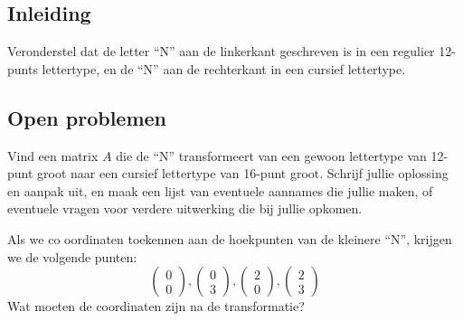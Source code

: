\documentclass{ximera}
\begin{document}
\author{Alexander Holvoet}

\subsection*{Inleiding}
Veronderstel dat de letter ``N'' aan de linkerkant geschreven is in een regulier 12-punts lettertype, en de ``N'' aan de rechterkant in een cursief lettertype.

\begin{figure}[H]
\end{figure}

\subsection*{Open problemen}

\begin{exercise}
    Vind een matrix $A$ die de ``N'' transformeert van een gewoon lettertype van 12-punt groot naar een cursief lettertype van 16-punt groot.
    Schrijf jullie oplossing en aanpak uit, en maak een lijst van eventuele aannames die jullie maken, of eventuele vragen voor verdere uitwerking die bij jullie opkomen.
    \begin{hint}
    Als we co oordinaten toekennen aan de hoekpunten van de kleinere ``N'', krijgen we de volgende punten:
    \[\begin{pmatrix}0 \\ 0\end{pmatrix}, \begin{pmatrix}0 \\ 3\end{pmatrix}, \begin{pmatrix}2 \\ 0\end{pmatrix}, \begin{pmatrix}2 \\ 3\end{pmatrix}\]
    Wat moeten de coordinaten zijn na de transformatie?
    \end{hint}
\end{exercise}
\end{document}
